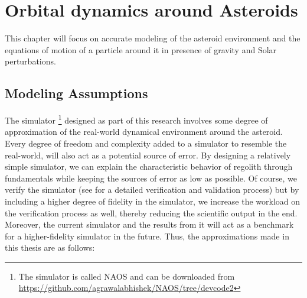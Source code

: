 \chapter{Orbital dynamics around Asteroids}
\label{chap:dynamics_modeling}
\graphicspath{{Modeling/Images/}}

This chapter will focus on accurate modeling of the asteroid environment and the equations of motion of a particle around it in presence of gravity and Solar perturbations.

\section{Modeling Assumptions}
\label{sec:assumptions}
The simulator \footnote{The simulator is called \gls{NAOS} and can be downloaded from \url{https://github.com/agrawalabhishek/NAOS/tree/devcode2}} designed as part of this research involves some degree of approximation of the real-world dynamical environment around the asteroid. Every degree of freedom and complexity added to a simulator to resemble the real-world, will also act as a potential source of error. By designing a relatively simple simulator, we can explain the characteristic behavior of regolith through fundamentals while keeping the sources of error as low as possible. Of course, we verify the simulator (see  for a detailed verification and validation process) but by including a higher degree of fidelity in the simulator, we increase the workload on the verification process as well, thereby reducing the scientific output in the end. Moreover, the current simulator and the results from it will act as a benchmark for a higher-fidelity simulator in the future. Thus, the approximations made in this thesis are as follows:
